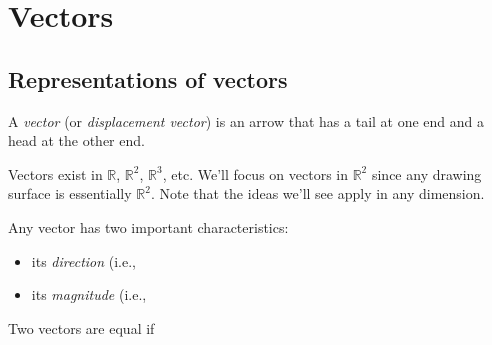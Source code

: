 \newlecture

\setcounter{section}{1}
\def\coursetopicnumber{I}
\def\textbooksection{9.2} %
\def\topic{Vectors} %
\def\shorttopic{Vectors} %
\def\textbookname{Active Calculus} %
\def\textbooksectionurl{https://activecalculus.org/vector/S-9-2-Vectors.html} %
\def\handoutday{} %


\thispagestyle{plain}
\topstuff
\section{\topic{} \booklink{}}
\subsection{Representations of vectors}
\begin{defn}[Vector]
A \emph{vector} (or \emph{displacement vector}) is an arrow that has a tail at one end and a head at the other end.
\end{defn}
\vspace{1in}

Vectors exist in $\mathbb{R}$, $\mathbb{R}^2$, $\mathbb{R}^3$, etc. We'll focus on vectors in $\mathbb{R}^2$ since any drawing surface is essentially $\mathbb{R}^2$. Note that the ideas we'll see apply in any dimension.

Any vector has two important characteristics: 
\begin{itemize}
    \item its \emph{direction} (i.e., 
    \item its \emph{magnitude} (i.e., 
\end{itemize}

\begin{framed}
    Two vectors are equal if  \\ \mbox{} \\ \mbox{} 
\end{framed}

